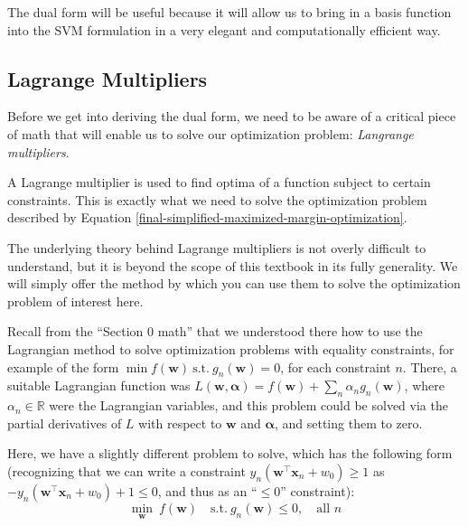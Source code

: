 
The dual form will be useful because it will allow us to bring in a basis function into the SVM formulation in a very elegant
and computationally efficient way.

\subsection{Lagrange Multipliers}

Before we get into deriving the dual form, we need to be aware of a critical piece of math that will enable us to solve our optimization problem: \textit{Langrange multipliers}.

A Lagrange multiplier is used to find optima of a function subject to certain constraints. This is exactly what we need to solve the optimization problem described by Equation \ref{final-simplified-maximized-margin-optimization}.

The underlying theory behind Lagrange multipliers is not overly difficult to understand, but it is beyond the scope of this textbook
in its fully generality. We will simply offer the method by which you can use them to solve
the optimization problem of interest here.

Recall from the ``Section 0 math'' that we understood there how to use the  Lagrangian method  to solve optimization problems with equality constraints, for example of the form $\min f(\mathbf{w}) \ \mbox{s.t.}\ g_n(\mathbf{w})=0$, for each constraint $n$. There, a suitable Lagrangian function was $L({\mathbf w},\boldsymbol{\alpha})=f({\mathbf w})+\sum_n\alpha_n g_n(\mathbf{w})$, where $\alpha_n\in\mathbb{R}$ were the Lagrangian variables,
and this problem
could be solved via the partial derivatives of $L$ with respect to ${\mathbf w}$ and $\boldsymbol{\alpha}$, and setting them to zero.
\medskip

Here, we have a slightly different problem to solve, which  has the following form (recognizing that we can write a constraint $ y_{n}(\textbf{w}^\top\textbf{x}_{n} + w_{0}) \geq 1$ as $-y_{n}(\textbf{w}^\top\textbf{x}_{n} + w_{0}) + 1\leq 0$, and thus as an ``$\leq 0$'' constraint):
%
\begin{equation}
  \label{eq:dp1}
  \min_{\mathbf{w}}\ f({\mathbf w}) \quad \mbox{s.t.}\ g_n({\mathbf w})\leq 0, \quad \mbox{all $n$}
\end{equation}

